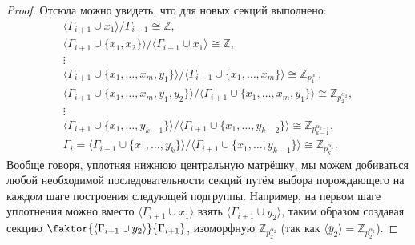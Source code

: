 \documentclass{article}
\begin{document}
\begin{proof}
    Отсюда можно увидеть, что для новых секций выполнено:
    \begin{gather*}
        \langle \Gamma_{i + 1} \cup x_1 \rangle / \Gamma_{i + 1} \cong \mathbb{Z}, \\
        \langle \Gamma_{i + 1} \cup \{ x_1, x_2 \} \rangle / \langle \Gamma_{i + 1} \cup x_1 \rangle \cong \mathbb{Z}, \\
        \vdots \\
        \langle \Gamma_{i + 1} \cup \{ x_1, \ldots, x_m, y_1 \} \rangle / \langle \Gamma_{i + 1} \cup \{ x_1, \ldots, x_m \} \rangle \cong \mathbb{Z}_{p_1^{\alpha_1}}, \\
        \langle \Gamma_{i + 1} \cup \{ x_1, \ldots, x_m, y_1, y_2 \} \rangle / \langle \Gamma_{i + 1} \cup \{ x_1, \ldots, x_m, y_1 \} \rangle \cong \mathbb{Z}_{p_2^{\alpha_2}}, \\
        \vdots \\
        \langle \Gamma_{i + 1} \cup \{ x_1, \ldots, y_{k - 1} \} \rangle / \langle \Gamma_{i + 1} \cup \{ x_1, \ldots, y_{k - 2} \} \rangle \cong \mathbb{Z}_{p_{k - 1}^{\alpha_{k - 1}}}, \\
        \Gamma_i = \langle \Gamma_{i + 1} \cup \{ x_1, \ldots, y_k \} \rangle / \langle \Gamma_{i + 1} \cup \{ x_1, \ldots, y_{k - 1} \} \rangle \cong \mathbb{Z}_{p_k^{\alpha_k}}.
    \end{gather*}
    Вообще говоря, уплотняя нижнюю центральную матрёшку, мы можем добиваться любой необходимой последовательности секций путём выбора порождающего на каждом шаге построения следующей подгруппы. Например, на первом шаге уплотнения можно вместо $\langle \Gamma_{i + 1} \cup x_1 \rangle$ взять $\langle \Gamma_{i + 1} \cup y_2 \rangle$, таким образом создавая секцию $\faktor{\langle \Gamma_{i + 1} \cup y_2 \rangle}{\Gamma_{i + 1}}$, изоморфную $\mathbb{Z}_{p_2^{\alpha_2}}$ (так как $\langle \overline{y}_2 \rangle = \mathbb{Z}_{p_2^{\alpha_2}}$).


\end{proof}
\end{document}

